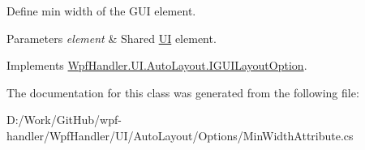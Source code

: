 Define min width of the G\+UI element. 


\begin{DoxyParams}{Parameters}
{\em element} & Shared \mbox{\hyperlink{namespace_wpf_handler_1_1_u_i}{UI}} element.\\
\hline
\end{DoxyParams}


Implements \mbox{\hyperlink{interface_wpf_handler_1_1_u_i_1_1_auto_layout_1_1_i_g_u_i_layout_option_ac2d2fa8aeaf753b3248381399f991005}{Wpf\+Handler.\+U\+I.\+Auto\+Layout.\+I\+G\+U\+I\+Layout\+Option}}.



The documentation for this class was generated from the following file\+:\begin{DoxyCompactItemize}
\item 
D\+:/\+Work/\+Git\+Hub/wpf-\/handler/\+Wpf\+Handler/\+U\+I/\+Auto\+Layout/\+Options/Min\+Width\+Attribute.\+cs\end{DoxyCompactItemize}
